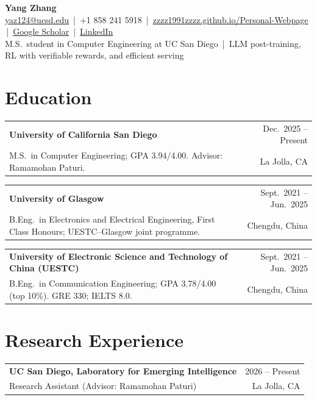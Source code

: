 \documentclass[10pt,letterpaper]{article}
\makeatletter
\newcommand{\entry}[4]{%
  \begin{tabularx}{\linewidth}{@{}X r@{}}
    \textbf{#1} & #2 \\
    #3 & #4 \\
  \end{tabularx}\par}
\makeatother
\begin{document}
\begin{center}
  {\LARGE\bfseries Yang Zhang}\\[3pt]
  \href{mailto:yaz124@ucsd.edu}{yaz124@ucsd.edu} \,|\,
  +1 858 241 5918 \,|\,
  \href{https://zzzz1991zzzz.github.io/Personal-Webpage/}{zzzz1991zzzz.github.io/Personal-Webpage} \,|\,
  \href{https://scholar.google.com/citations?user=IVB_6X4AAAAJ&hl=en}{Google Scholar} \,|\,
  \href{https://www.linkedin.com/in/yang-zhang-8b2181442/}{LinkedIn}\\[2pt]
  M.S.\ student in Computer Engineering at UC San Diego \,|\, LLM post-training, RL with verifiable rewards, and efficient serving
\end{center}

\section{Education}
\entry{University of California San Diego}{Dec.\ 2025 -- Present}
      {M.S.\ in Computer Engineering; GPA 3.94/4.00. Advisor: Ramamohan Paturi.}{La Jolla, CA}
\vspace{2pt}
\entry{University of Glasgow}{Sept.\ 2021 -- Jun.\ 2025}
      {B.Eng.\ in Electronics and Electrical Engineering, First Class Honours; UESTC--Glasgow joint programme.}{Chengdu, China}
\vspace{2pt}
\entry{University of Electronic Science and Technology of China (UESTC)}{Sept.\ 2021 -- Jun.\ 2025}
      {B.Eng.\ in Communication Engineering; GPA 3.78/4.00 (top 10\%). GRE 330; IELTS 8.0.}{Chengdu, China}

\section{Research Experience}
\entry{UC San Diego, Laboratory for Emerging Intelligence}{2026 -- Present}
      {Research Assistant (Advisor: Ramamohan Paturi)}{La Jolla, CA}
\end{document}
